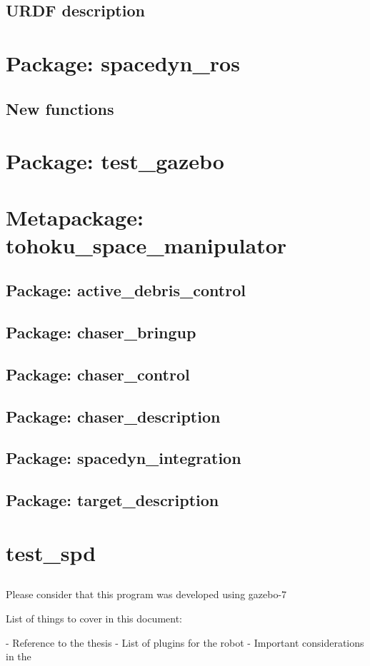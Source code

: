 \documentclass[11pt, twoside, a4paper]{report}
\begin{document}
	

\subsection{URDF description}



\section{Package: spacedyn\_ros }
\subsection{New functions}

\section{Package: test\_gazebo}

\section{Metapackage: tohoku\_space\_manipulator}

\subsection{Package: active\_debris\_control }
\subsection{Package: chaser\_bringup}
\subsection{Package: chaser\_control}
\subsection{Package: chaser\_description}
\subsection{Package: spacedyn\_integration}
\subsection{Package: target\_description}
\section{test\_spd}

\subsection{}

Please consider that this program was developed using gazebo-7


List of things to cover in this document:


 - Reference to the thesis
 - List of plugins for the robot
 - Important considerations in the 
\end{document}
